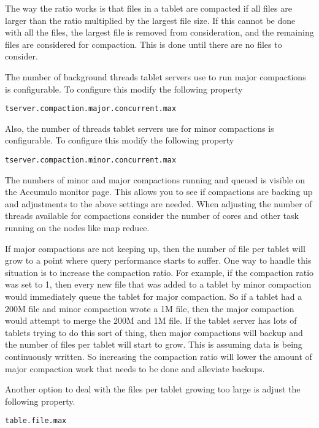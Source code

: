 The way the ratio works is that files in a tablet are compacted if all files
are larger than the ratio multiplied by the largest file size. If this cannot
be done with all the files, the largest file is removed from consideration, and
the remaining files are considered for compaction. This is done until there are
no files to consider.

The number of background threads tablet servers use to run major compactions is
configurable.  To configure this modify the following property

\begin{verbatim}
tserver.compaction.major.concurrent.max
\end{verbatim}

Also, the number of threads tablet servers use for minor compactions is
configurable.  To configure this modify the following property

\begin{verbatim}
tserver.compaction.minor.concurrent.max
\end{verbatim}

The numbers of minor and major compactions running and queued is visible on the
Accumulo monitor page.  This allows you to see if compactions are backing up
and adjustments to the above settings are needed.  When adjusting the number of
threads available for compactions consider the number of cores and other task
running on the nodes like map reduce.

If major compactions are not keeping up, then the number of file per tablet
will grow to a point where query performance starts to suffer. One way to
handle this situation is to increase the compaction ratio.  For example, if the
compaction ratio was set to 1, then every new file that was added to a tablet
by minor compaction would immediately queue the tablet for major compaction.
So if a tablet had a 200M file and minor compaction wrote a 1M file, then the
major compaction would attempt to merge the 200M and 1M file.  If the tablet
server has lots of tablets trying to do this sort of thing, then major
compactions will backup and the number of files per tablet will start to grow.
This is assuming data is being continuously written.  So increasing the
compaction ratio will lower the amount of major compaction work that needs to
be done and alleviate backups.

Another option to deal with the files per tablet growing too large is adjust
the following property. 

\begin{verbatim}
table.file.max  
\end{verbatim}

